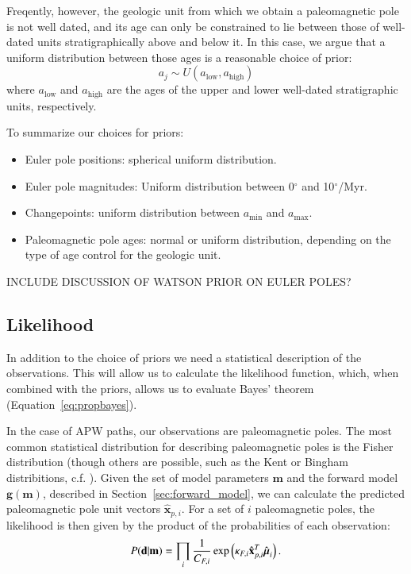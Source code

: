 \documentclass[preprint,12pt,authoryear]{elsarticle}
\newcommand{\mitbf}[1]{\hbox{\mathversion{bold}$#1$}}
\begin{document}
Freqently, however, the geologic unit from which we obtain a paleomagnetic pole
is not well dated, and its age can only be constrained to lie between those
of well-dated units stratigraphically above and below it. In this case,
we argue that a uniform distribution between those ages is a reasonable choice
of prior:
\begin{equation}
a_j \sim U(a_\mathrm{low}, a_\mathrm{high})
\end{equation}
where $a_\mathrm{low}$ and $a_\mathrm{high}$ are the ages of the upper and lower
well-dated stratigraphic units, respectively.

To summarize our choices for priors:
\begin{itemize}
\item Euler pole positions: spherical uniform distribution.
\item Euler pole magnitudes: Uniform distribution between 0$^\circ$ and 10$^\circ$/Myr.
\item Changepoints: uniform distribution between $a_\mathrm{min}$ and $a_\mathrm{max}$.
\item Paleomagnetic pole ages: normal or uniform distribution, depending on the type of age control for the geologic unit.
\end{itemize}


INCLUDE DISCUSSION OF WATSON PRIOR ON EULER POLES?


\subsection{Likelihood}

In addition to the choice of priors we need a statistical description of the observations.
This will allow us to calculate the likelihood function, which, when combined with the priors,
allows us to evaluate Bayes' theorem (Equation~\eqref{eq:propbayes}).

In the case of APW paths, our observations are paleomagnetic poles.
The most common statistical distribution for describing paleomagnetic poles is the Fisher distribution
(though others are possible, such as the Kent or Bingham distribitions, c.f. \citet{tauxe2009essentials}).
Given the set of model parameters $\mathbf{m}$ and the forward model $\mathbf{g}(\mathbf{m})$, described
in Section~\ref{sec:forward_model}, we can calculate the predicted paleomagnetic pole unit vectors $\hat{\mathbf{x}}_{p,i}$.
For a set of $i$ paleomagnetic poles, the likelihood is then given by the product of the probabilities
of each observation:
\begin{equation}
P(\mathbf{d} \vert \mathbf{m}) = \displaystyle\prod_i \frac{1}{C_{F,i}} \exp \left( \kappa_{F,i} \hat{\mathbf{x}}_{p,i}^T \hat{\mitbf{\mu}}_i \right).
\label{eq:model_likelihood}
\end{equation}
\end{document}
